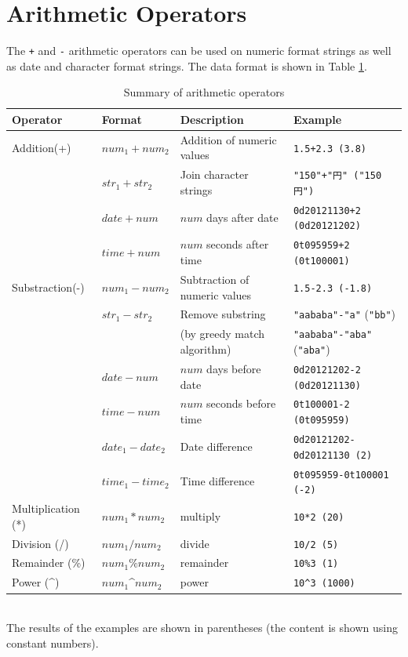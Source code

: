 \section{Arithmetic Operators}
The \verb|+| and \verb|-| arithmetic operators can be used on numeric format strings as well as date and character format strings. The data format is shown in Table \ref{tbl:mcal_ope}. 

\begin{table}[!hb]
\begin{center}
\caption{Summary of arithmetic operators \label{tbl:mcal_ope}}
{\small
  \begin{tabular}{l|l|l|l} \hline
Operator&Format&Description&Example\\
\hline
Addition(+) & $num_1+num_2$ & Addition of numeric values   & \verb|1.5+2.3 (3.8)|\\
        & $str_1+str_2$ & Join character strings    & \verb|"150"+"円" ("150円")|\\
        & $date+num$    & $num$ days after date & \verb|0d20121130+2 (0d20121202)|\\
        & $time+num$    & $num$ seconds after time & \verb|0t095959+2 (0t100001)|\\
\hline
Substraction(-) & $num_1-num_2$   & Subtraction of numeric values      & \verb|1.5-2.3 (-1.8)|\\
        & $str_1-str_2$   & Remove substring   & \verb|"aababa"-"a"| (\verb|"bb"|)\\
        &                 & (by greedy match algorithm) & \verb|"aababa"-"aba"| (\verb|"aba"|)\\
        & $date-num$      & $num$ days before date    & \verb|0d20121202-2 (0d20121130)|\\
        & $time-num$      & $num$ seconds before time    & \verb|0t100001-2 (0t095959)|\\
        & $date_1-date_2$ & Date difference             & \verb|0d20121202-0d20121130 (2)|\\
        & $time_1-time_2$ & Time difference             & \verb|0t095959-0t100001 (-2)|\\
\hline
Multiplication (*) & $num_1*num_2$ & multiply & \verb|10*2 (20)|\\
\hline
Division (/) & $num_1/num_2$ & divide & \verb|10/2 (5)|\\
\hline
Remainder (\%) & $num_1\%num_2$ & remainder & \verb|10%3 (1)|\\
\hline
Power (\^{}) & $num_1$\^{}$num_2$ & power & \verb|10^3 (1000)|\\

\hline
  \end{tabular}
\\The results of the examples are shown in parentheses (the content is shown using constant numbers).
  }
  \end{center}
\end{table}

